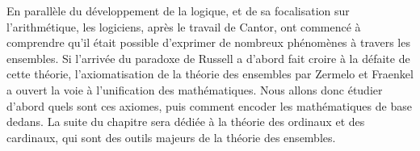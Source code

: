 En parallèle du développement de la logique, et de sa focalisation sur l'arithmétique, les logiciens, après le travail de Cantor, ont commencé à comprendre qu'il était possible d'exprimer de nombreux phénomènes à travers les ensembles. Si l'arrivée du paradoxe de Russell a d'abord fait croire à la défaite de cette théorie, l'axiomatisation de la théorie des ensembles par Zermelo et Fraenkel a ouvert la voie à l'unification des mathématiques. Nous allons donc étudier d'abord quels sont ces axiomes, puis comment encoder les mathématiques de base dedans. La suite du chapitre sera dédiée à la théorie des ordinaux et des cardinaux, qui sont des outils majeurs de la théorie des ensembles.






